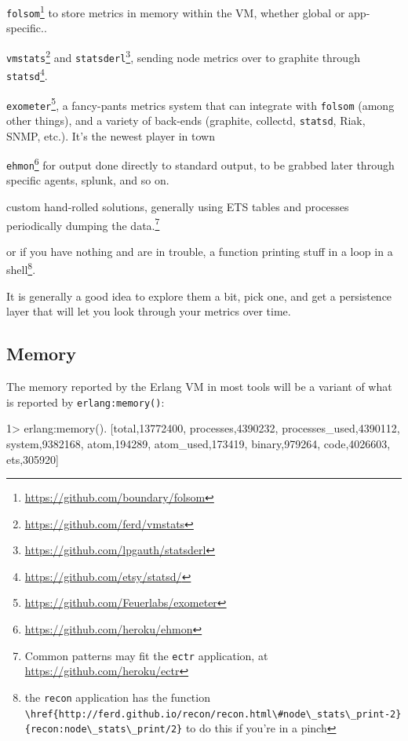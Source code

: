 \documentclass[11pt, oneside]{book}   	%
\newcommand{\app}[1]{\Verb`#1`}
\newcommand{\otpapp}[1]{\Verb`#1`}
\newcommand{\function}[1]{\Verb`#1`}
\newcommand{\expression}[1]{\Verb`#1`}
\begin{document}
\begin{itemize*}
	\item \otpapp{folsom}\footnote{\href{https://github.com/boundary/folsom}{https://github.com/boundary/folsom}} to store metrics in memory within the VM, whether global or app-specific..
	\item \otpapp{vmstats}\footnote{\href{https://github.com/ferd/vmstats}{https://github.com/ferd/vmstats}} and \otpapp{statsderl}\footnote{\href{https://github.com/lpgauth/statsderl}{https://github.com/lpgauth/statsderl}}, sending node metrics over to graphite through \app{statsd}\footnote{\href{https://github.com/etsy/statsd/}{https://github.com/etsy/statsd/}}.
	\item \otpapp{exometer}\footnote{\href{https://github.com/Feuerlabs/exometer}{https://github.com/Feuerlabs/exometer}}, a fancy-pants metrics system that can integrate with \otpapp{folsom} (among other things),  and a variety of back-ends (graphite, collectd, \app{statsd}, Riak, SNMP, etc.). It's the newest player in town
	\item \otpapp{ehmon}\footnote{\href{https://github.com/heroku/ehmon}{https://github.com/heroku/ehmon}} for output done directly to standard output, to be grabbed later through specific agents, splunk, and so on.
	\item custom hand-rolled solutions, generally using ETS tables and processes periodically dumping the data.\footnote{Common patterns may fit the \otpapp{ectr} application, at \href{https://github.com/heroku/ectr}{https://github.com/heroku/ectr}}
	\item or if you have nothing and are in trouble, a function printing stuff in a loop in a shell\footnote{the \otpapp{recon} application has the function \function{\href{http://ferd.github.io/recon/recon.html\#node\_stats\_print-2}{recon:node\_stats\_print/2}} to do this if you're in a pinch}.
\end{itemize*}

It is generally a good idea to explore them a bit, pick one, and get a persistence layer that will let you look through your metrics over time.

\subsection{Memory}

The memory reported by the Erlang VM in most tools will be a variant of what is reported by \expression{erlang:memory()}:

\begin{VerbatimEshell}
1> erlang:memory().
[{total,13772400},
 {processes,4390232},
 {processes_used,4390112},
 {system,9382168},
 {atom,194289},
 {atom_used,173419},
 {binary,979264},
 {code,4026603},
 {ets,305920}]
\end{VerbatimEshell}
\end{document}

